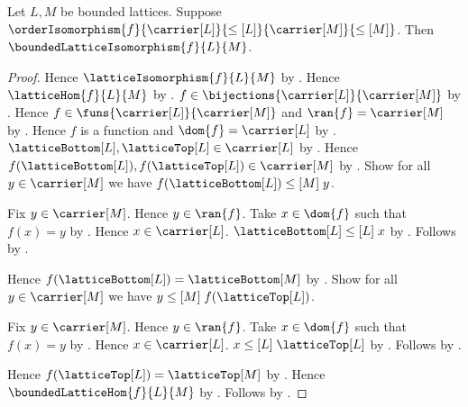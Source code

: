 \begin{theorem}\label{order_isomorphism_between_bounded_lattices_is_bounded_lattice_isomorphism}
    Let $L,M$ be bounded lattices.
    Suppose
        $\orderIsomorphism
            {f}{\carrier[L]}{\leq[L]}{\carrier[M]}{\leq[M]}$.
    Then $\boundedLatticeIsomorphism{f}{L}{M}$.
\end{theorem}
\begin{proof}
    Hence $\latticeIsomorphism{f}{L}{M}$ by
        .
    Hence $\latticeHom{f}{L}{M}$ by
        .
    $f\in\bijections{\carrier[L]}{\carrier[M]}$ by
        .
    Hence $f\in\funs{\carrier[L]}{\carrier[M]}$ and
        $\ran{f}=\carrier[M]$ by
        .
    Hence $f$ is a function and $\dom{f}=\carrier[L]$ by
        .
    $\latticeBottom[L],\latticeTop[L]\in\carrier[L]$ by
        .
    Hence $f(\latticeBottom[L]),f(\latticeTop[L])\in\carrier[M]$ by
        .
    Show for all $y\in\carrier[M]$ we have
        $f(\latticeBottom[L])\mathrel{\leq[M]}y$.
    \begin{subproof}
        Fix $y\in\carrier[M]$.
        Hence $y\in\ran{f}$.
        Take $x\in\dom{f}$ such that $f(x)=y$ by
            .
        Hence $x\in\carrier[L]$.
        $\latticeBottom[L]\mathrel{\leq[L]}x$ by
            .
        Follows by .
    \end{subproof}
    Hence $f(\latticeBottom[L])=\latticeBottom[M]$ by
        .
    Show for all $y\in\carrier[M]$ we have
        $y\mathrel{\leq[M]}f(\latticeTop[L])$.
    \begin{subproof}
        Fix $y\in\carrier[M]$.
        Hence $y\in\ran{f}$.
        Take $x\in\dom{f}$ such that $f(x)=y$ by
            .
        Hence $x\in\carrier[L]$.
        $x\mathrel{\leq[L]}\latticeTop[L]$ by
            .
        Follows by .
    \end{subproof}
    Hence $f(\latticeTop[L])=\latticeTop[M]$ by
        .
    Hence $\boundedLatticeHom{f}{L}{M}$ by
        .
    Follows by .
\end{proof}

